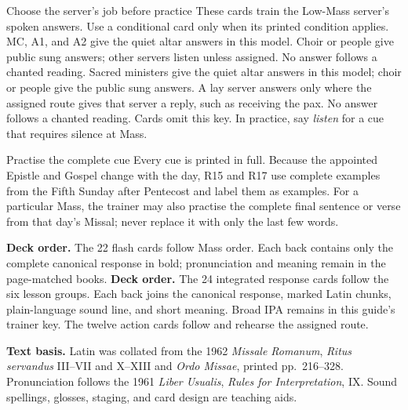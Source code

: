 \begin{watchbox}{Choose the server's job before practice}
\GuideVoiceChoice
{These cards train the Low-Mass server's spoken answers. Use a conditional
card only when its printed condition applies.}
{MC, A1, and A2 give the quiet altar answers in this model. Choir or people
give public sung answers; other servers listen unless assigned.
No answer follows a chanted reading.}
{Sacred ministers give the quiet altar answers in this model; choir or people
give the public sung answers. A lay server answers only where the assigned
route gives that server a reply, such as receiving the pax. No answer follows
a chanted reading.}
Cards omit this key. In practice, say \emph{listen} for a cue that requires
silence at Mass.
\end{watchbox}

\begin{watchbox}{Practise the complete cue}
Every cue is printed in full. Because the appointed Epistle and Gospel change
with the day, R15 and R17 use complete examples from the Fifth Sunday after
Pentecost and label them as examples. For a particular Mass, the trainer may
also practise the complete final sentence or verse from that day's Missal;
never replace it with only the last few words.
\end{watchbox}

\ifLowMassGuide
\noindent\textbf{Deck order.} The 22 flash cards follow Mass order. Each back
contains only the complete canonical response in bold; pronunciation and
meaning remain in the page-matched books.
\else
\noindent\textbf{Deck order.} The 24 integrated response cards follow the six
lesson groups. Each back joins the canonical response, marked Latin chunks,
plain-language sound line, and short meaning. Broad IPA remains in this guide's
trainer key.
The twelve action cards follow and rehearse the assigned route.
\fi

{\small\noindent\textbf{Text basis.} Latin was collated from the 1962
\emph{Missale Romanum}, \emph{Ritus servandus} III--VII and X--XIII and
\emph{Ordo Missae}, printed pp.~216--328. Pronunciation follows the 1961
\emph{Liber Usualis}, \emph{Rules for Interpretation}, IX. Sound spellings,
glosses, staging, and card design are teaching aids.\par}
\fi
\ifCardsOnlyGuide
\ifResponseDataOnlyGuide\else

\carddeckoddpage

